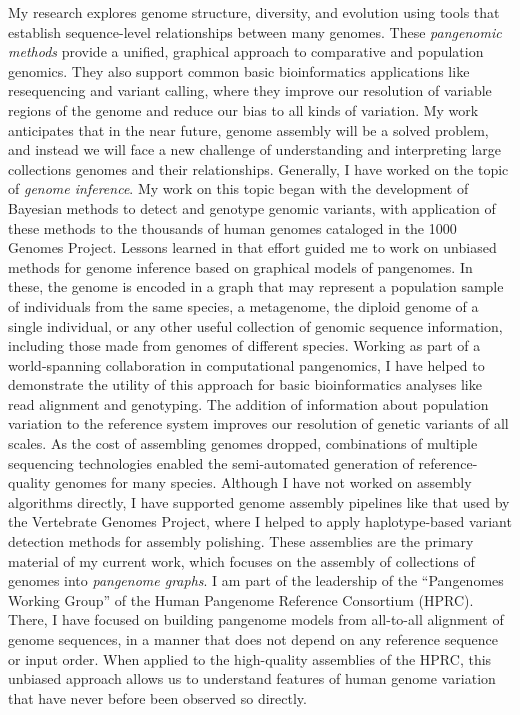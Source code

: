 \documentclass{nihbiosketch}
\begin{document}
\begin{statement}
My research explores genome structure, diversity, and evolution using tools that establish sequence-level relationships between many genomes.
These \emph{pangenomic methods} provide a unified, graphical approach to comparative and population genomics.
They also support common basic bioinformatics applications like resequencing and variant calling, where they improve our resolution of variable regions of the genome and reduce our bias to all kinds of variation.
My work anticipates that in the near future, genome assembly will be a solved problem, and instead we will face a new challenge of understanding and interpreting large collections genomes and their relationships.
Generally, I have worked on the topic of \emph{genome inference}.
My work on this topic began with the development of Bayesian methods to detect and genotype genomic variants, with application of these methods to the thousands of human genomes cataloged in the 1000 Genomes Project.
Lessons learned in that effort guided me to work on unbiased methods for genome inference based on graphical models of pangenomes.
In these, the genome is encoded in a graph that may represent a population sample of individuals from the same species, a metagenome, the diploid genome of a single individual, or any other useful collection of genomic sequence information, including those made from genomes of different species.
Working as part of a world-spanning collaboration in computational pangenomics, I have helped to demonstrate the utility of this approach for basic bioinformatics analyses like read alignment and genotyping.
The addition of information about population variation to the reference system improves our resolution of genetic variants of all scales.
As the cost of assembling genomes dropped, combinations of multiple sequencing technologies enabled the semi-automated generation of reference-quality genomes for many species.
Although I have not worked on assembly algorithms directly, I have supported genome assembly pipelines like that used by the Vertebrate Genomes Project, where I helped to apply haplotype-based variant detection methods for assembly polishing.
These assemblies are the primary material of my current work, which focuses on the assembly of collections of genomes into \emph{pangenome graphs}.
I am part of the leadership of the ``Pangenomes Working Group'' of the Human Pangenome Reference Consortium (HPRC).
There, I have focused on building pangenome models from all-to-all alignment of genome sequences, in a manner that does not depend on any reference sequence or input order.
When applied to the high-quality assemblies of the HPRC, this unbiased approach allows us to understand features of human genome variation that have never before been observed so directly.


\end{statement}
\end{document}
